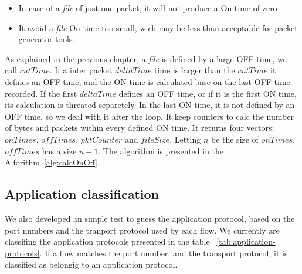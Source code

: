 \begin{itemize}
\item In case of a \textit{file} of just one packet, it will not produce a On time of zero
\item It avoid a \textit{file} On time too small, wich may be less than acceptable for packet generator tools.
\end{itemize}

As explained in the previous chapter, a \textit{file} is defined by a large OFF time, we call $cutTime$. If a inter packet $deltaTime$ time is larger than the $cutTime$ it defines an OFF time, and the ON time is calculated base on the last OFF time recorded. 
If the first $deltaTime$ defines an OFF time, or if it is the first ON time, its calculation is threated separetely. In the last ON time, it is not defined by an OFF time, so we deal with it after the loop. It keep counters to calc the number of bytes and packets within every defined ON time. It returns four vectors: $onTimes$, $offTimes$, $pktCounter$ and $fileSize$. Letting $n$ be the size of $onTimes$,  $offTimes$ has a size $n - 1$. The algorithm is presented in the Alforithm~\ref{alg:calcOnOff}.


\subsection{Application classification}


We also developed an simple test to guess the application protocol, based on the port numbers and the tranport protocol used by each flow. We currently are classifing the application protocols presented in the table ~\ref{tab:application-protocols}. If a flow matches the port number, and the transport protocol, it is classified as belongig to an application protocol.


